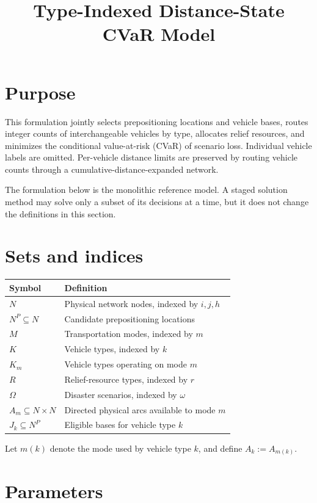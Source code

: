 \documentclass[11pt]{article}
\title{Type-Indexed Distance-State CVaR Model}
\author{}
\date{}
\begin{document}
\maketitle

\section{Purpose}

This formulation jointly selects prepositioning locations and vehicle bases,
routes integer counts of interchangeable vehicles by type, allocates relief
resources, and minimizes the conditional value-at-risk (CVaR) of scenario
loss.  Individual vehicle labels are omitted.  Per-vehicle distance limits are
preserved by routing vehicle counts through a cumulative-distance-expanded
network.

The formulation below is the monolithic reference model.  A staged solution
method may solve only a subset of its decisions at a time, but it does not
change the definitions in this section.

\section{Sets and indices}

\begin{tabular}{ll}
\toprule
Symbol & Definition \\
\midrule
$N$ & Physical network nodes, indexed by $i,j,h$ \\
$N^P\subseteq N$ & Candidate prepositioning locations \\
$M$ & Transportation modes, indexed by $m$ \\
$K$ & Vehicle types, indexed by $k$ \\
$K_m$ & Vehicle types operating on mode $m$ \\
$R$ & Relief-resource types, indexed by $r$ \\
$\Omega$ & Disaster scenarios, indexed by $\omega$ \\
$A_m\subseteq N\times N$ & Directed physical arcs available to mode $m$ \\
$J_k\subseteq N^P$ & Eligible bases for vehicle type $k$ \\
\bottomrule
\end{tabular}

Let $m(k)$ denote the mode used by vehicle type $k$, and define
$A_k:=A_{m(k)}$.

\section{Parameters}
\end{document}
